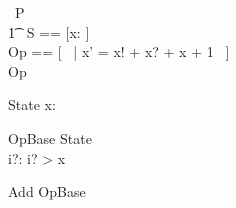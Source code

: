 
\begin{circus}
   \circprocess\ P\ \circdef \circbegin \\
        \t1 \circstate\ S == [x: \nat] \\
	Op == [~ | x' = x! + x? + x + 1 ~] \\
	\circspot \lschexpract Op \rschexpract \\
  \circend
\end{circus}

\begin{schema}{State}
   x: \nat
\end{schema}

\begin{schema}{OpBase}
    \Delta State \\
     i?: \nat
\where
    i? > x
\end{schema}

\begin{schema}{Add}
    OpBase
\where
    [ | x' = x + 1 ]
\end{schema}

